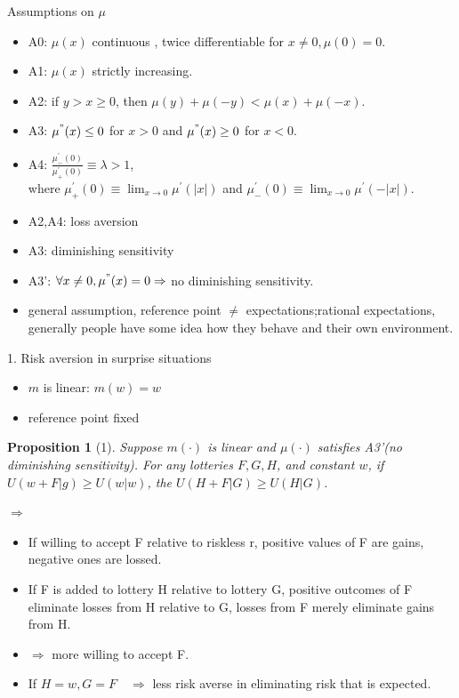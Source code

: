 \documentclass[11pt,aspectratio=169]{beamer}
\newtheorem{proposition}{Proposition}
\begin{document}
\begin{frame}{Assumptions on $\mu$}  
    \begin{itemize}
        \item A0: $\mu(x) $ continuous , twice differentiable for $x\neq 0, \mu(0)=0 $.\medskip
        \item A1: $ \mu(x)$ strictly increasing. \medskip
        \item A2: if $y>x\geq 0 $, then $\mu(y)+\mu(-y) <\mu(x) +\mu(-x) $.\medskip
        \item A3: $ \mu^{"}(x) \leq 0 $ for $ x>0$ and $\mu^{"}(x) \geq 0$ for $ x<0 $.\medskip
        \item A4: $\frac{\mu^{'}_{-}(0)}{\mu^{'}_{+}(0)} \equiv \lambda >1 $, \\
    where $ \mu^{'}_{+}(0) \equiv \lim_{x \to 0} \mu^{'}(\left\lvert x \right\rvert )$ and $ \mu^{'}_{-}(0) \equiv \lim_{x \to 0} \mu^{'}(-\left\lvert x \right\rvert )$.\medskip
        \item A2,A4: loss aversion \medskip
        \item A3: diminishing sensitivity\medskip
        \item A3': $\forall x \neq 0, \mu^{"}(x)=0 \Rightarrow $ no diminishing sensitivity.\medskip
        \item general assumption, reference point $\neq $ expectations;rational expectations, generally people have some idea how they behave and their own environment.\medskip
	\end{itemize}
\end{frame}

\begin{frame}{1. Risk aversion in surprise situations}
    \begin{itemize}
        \item $m$ is linear: $m(w)=w$\medskip
        \item reference point fixed\medskip
	\end{itemize}
    \begin{proposition}[1]
        Suppose $m(\cdot)$ is linear and $\mu(\cdot)$ satisfies A3'(no diminishing sensitivity). For any lotteries $F,G,H$, and constant $w$,
        if $ U(w+F|g) \geq U(w|w)$, the $U(H+F|G) \geq U(H|G)$.\\
    \end{proposition}
    $\Rightarrow$
    \begin{itemize}
        \item If willing to accept F relative to riskless r, positive values of F are gains, negative ones are lossed.\medskip
        \item If F is added to lottery H relative to lottery G, positive outcomes of F eliminate losses from H relative to G, losses from F merely eliminate gains from H.\medskip
        \item $\Rightarrow$ more willing to accept F.\medskip
        \item If $H=w, G=F \quad \Rightarrow$  less risk averse in eliminating risk that is expected.\medskip
	\end{itemize}
\end{frame}
\end{document}
